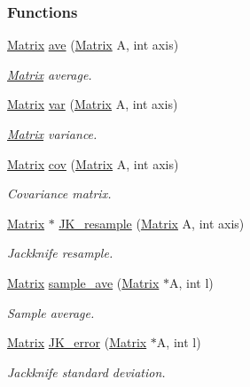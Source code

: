 \subsubsection*{Functions}
\begin{DoxyCompactItemize}
\item 
\hyperlink{classMatrix}{Matrix} \hyperlink{Stats_8C_ae39b64f2f2f119f1fd195d6ca0583a6f}{ave} (\hyperlink{classMatrix}{Matrix} A, int axis)
\begin{DoxyCompactList}\small\item\em \hyperlink{classMatrix}{Matrix} average. \end{DoxyCompactList}\item 
\hyperlink{classMatrix}{Matrix} \hyperlink{Stats_8C_a2e68f0f11b60ca80c496e3afb4b7cc01}{var} (\hyperlink{classMatrix}{Matrix} A, int axis)
\begin{DoxyCompactList}\small\item\em \hyperlink{classMatrix}{Matrix} variance. \end{DoxyCompactList}\item 
\hyperlink{classMatrix}{Matrix} \hyperlink{Stats_8C_ac9e2628dd0e3b331f9113cf8d731b10c}{cov} (\hyperlink{classMatrix}{Matrix} A, int axis)
\begin{DoxyCompactList}\small\item\em Covariance matrix. \end{DoxyCompactList}\item 
\hyperlink{classMatrix}{Matrix} $\ast$ \hyperlink{Stats_8C_a143c09048292af2563e2996d2c2f4922}{J\+K\+\_\+resample} (\hyperlink{classMatrix}{Matrix} A, int axis)
\begin{DoxyCompactList}\small\item\em Jackknife resample. \end{DoxyCompactList}\item 
\hyperlink{classMatrix}{Matrix} \hyperlink{Stats_8C_affd6f6d5163a812e041030361c401f90}{sample\+\_\+ave} (\hyperlink{classMatrix}{Matrix} $\ast$A, int l)
\begin{DoxyCompactList}\small\item\em Sample average. \end{DoxyCompactList}\item 
\hyperlink{classMatrix}{Matrix} \hyperlink{Stats_8C_a0285e96e7ca20265cc8af9eafc5bbb3b}{J\+K\+\_\+error} (\hyperlink{classMatrix}{Matrix} $\ast$A, int l)
\begin{DoxyCompactList}\small\item\em Jackknife standard deviation. \end{DoxyCompactList}\item 

\end{DoxyCompactItemize}
